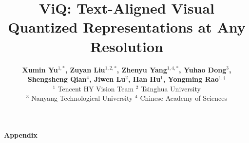 \documentclass[runningheads]{llncs}
\begin{document}
\title{ViQ: Text-Aligned Visual Quantized Representations at Any Resolution}


\author{\textbf{Xumin Yu$^{1,*}$, Zuyan Liu$^{1,2,*}$, Zhenyu Yang$^{1,4,*}$, Yuhao Dong$^{3}$,} \\
\textbf{Shengsheng Qian$^{4}$, Jiwen Lu$^{2}$, Han Hu$^{1}$, Yongming Rao$^{1,\dagger}$}\\[0.5em]
$^1$ Tencent HY Vision Team \quad $^2$ Tsinghua University \\[0.2em]
$^3$ Nanyang Technological University \quad $^4$ Chinese Academy of Sciences}


\maketitle

\makeatletter
\def\@makefnmark{}
\makeatother
{}








\newpage

\renewcommand{\refname}{References}
\renewcommand{\bibname}{References}
\renewcommand{\bibsection}{\section*{\raggedright \Large References}}



\newpage
\appendix
\setcounter{section}{0}
\renewcommand{\thesection}{\Alph{section}}
{\large\bfseries Appendix\par}
\vspace{1em}

\end{document}
